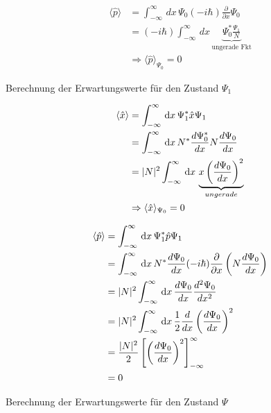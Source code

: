 \begin{align}
    \langle\hat p \rangle &= \int_{-\infty}^{\infty}\,dx\, \Psi _0 (-i\hbar)\frac{\partial}{\partial x} \Psi _0 \\
    &= (-i \hbar)\int_{-\infty}^{\infty}\,dx\, \underbrace{\Psi_0^* \frac{\Psi _1}{N}}_{\text{ungerade Fkt}}\\
    &\Rightarrow \langle\hat p\rangle_{\Psi _0} = 0
\end{align}

Berechnung der Erwartungswerte für den Zustand $\Psi _1$

\begin{align}
\langle\hat x\rangle &=\int_{-\infty}^{\infty} \,\mathrm{d}x\, \Psi_1^* \hat x \Psi _1\\
&=\int_{-\infty}^{\infty} \,\mathrm{d}x\, N^* \frac{d\Psi _0^*}{dx} N \frac{d\Psi _0}{dx}\\
&=\lvert N\rvert^2 \int_{-\infty}^{\infty} \,\mathrm{d}x\, \underbrace{x \left(\frac{d \Psi _0}{dx} \right)^2}_{ungerade}\\
&\Rightarrow \langle\hat x\rangle_{\Psi _0} = 0
\end{align}

\begin{align}
    \langle\hat p \rangle &=\int_{-\infty}^{\infty} \,\mathrm{d}x\, \Psi _1^* \hat p \Psi _1\\
    &= \int_{-\infty}^{\infty} \,\mathrm{d}x\, N^* \frac{d \Psi _0}{dx} (-i\hbar) \frac{\partial}{\partial x}\left(N \frac{d \Psi _0}{dx}\right)\\
    &= \lvert N\rvert^2 \int_{-\infty}^{\infty} \,\mathrm{d}x\, \frac{d \Psi _0}{dx} \frac{d^2 \Psi _0}{dx^2}\\
    &=\lvert N\rvert^2 \int_{-\infty}^{\infty} \,\mathrm{d}x\, \frac{1}{2} \frac{d}{dx} \left(\frac{d\Psi _0}{dx}\right)^2\\
    &= \frac{\lvert N\rvert^2}{2} \left[ \left(\frac{d\Psi _0}{dx}\right)^2\right]_{-\infty}^{\infty}\\
    &=0
\end{align}

Berechnung der Erwartungswerte für den Zustand $\Psi$

